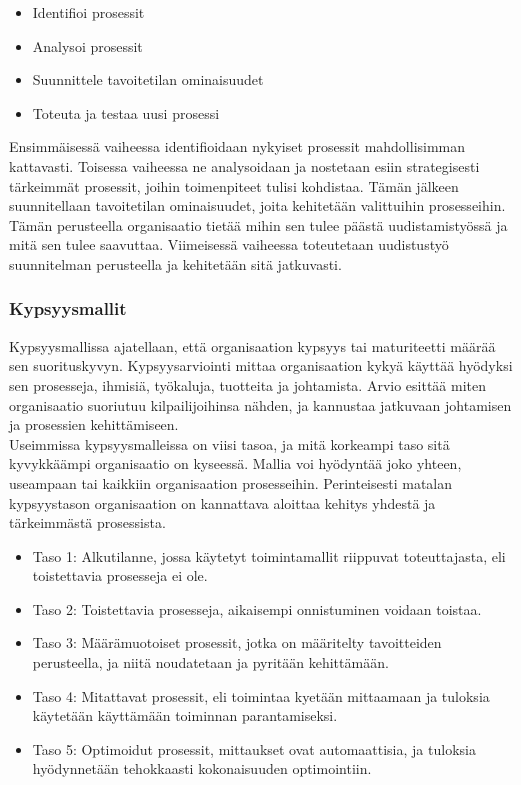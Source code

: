 \documentclass[finnish,12pt,a4paper,pdftex]{article}
\begin{document}
\begin{itemize}
\setlength{\itemsep}{0pt}
    \item Identifioi prosessit
    \item Analysoi prosessit
    \item Suunnittele tavoitetilan ominaisuudet
    \item Toteuta ja testaa uusi prosessi
\end{itemize}

Ensimmäisessä vaiheessa identifioidaan nykyiset prosessit mahdollisimman kattavasti. Toisessa vaiheessa ne analysoidaan ja nostetaan esiin strategisesti tärkeimmät prosessit, joihin toimenpiteet tulisi kohdistaa. Tämän jälkeen suunnitellaan tavoitetilan ominaisuudet, joita kehitetään valittuihin prosesseihin. Tämän perusteella organisaatio tietää mihin sen tulee päästä uudistamistyössä ja mitä sen tulee saavuttaa. Viimeisessä vaiheessa toteutetaan uudistustyö suunnitelman perusteella ja kehitetään sitä jatkuvasti. \citep{mohapatra}\\

\subsubsection{Kypsyysmallit}

Kypsyysmallissa ajatellaan, että organisaation kypsyys tai maturiteetti määrää sen suorituskyvyn. Kypsyysarviointi mittaa organisaation kykyä käyttää hyödyksi sen prosesseja, ihmisiä, työkaluja, tuotteita ja johtamista. Arvio esittää miten organisaatio suoriutuu kilpailijoihinsa nähden, ja kannustaa jatkuvaan johtamisen ja prosessien kehittämiseen. \citep{mohapatra}\\

Useimmissa kypsyysmalleissa on viisi tasoa, ja mitä korkeampi taso sitä kyvykkäämpi organisaatio on kyseessä. Mallia voi hyödyntää joko yhteen, useampaan tai kaikkiin organisaation prosesseihin. Perinteisesti matalan kypsyystason organisaation on kannattava aloittaa kehitys yhdestä ja tärkeimmästä prosessista. \citep{mohapatra}

\begin{itemize}
\setlength{\itemsep}{0pt}
    \item Taso 1: Alkutilanne, jossa käytetyt toimintamallit riippuvat toteuttajasta, eli toistettavia prosesseja ei ole.
    \item Taso 2: Toistettavia prosesseja, aikaisempi onnistuminen voidaan toistaa.
    \item Taso 3: Määrämuotoiset prosessit, jotka on määritelty tavoitteiden perusteella, ja niitä noudatetaan ja pyritään kehittämään.
    \item Taso 4: Mitattavat prosessit, eli toimintaa kyetään mittaamaan ja tuloksia käytetään käyttämään toiminnan parantamiseksi.
    \item Taso 5: Optimoidut prosessit, mittaukset ovat automaattisia, ja tuloksia hyödynnetään tehokkaasti kokonaisuuden optimointiin.
\end{itemize}
\end{document}
